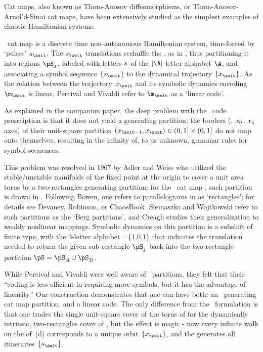 Cat maps, also known as Thom-Anosov diffeomorphisms, or
Thom-Anosov-Arnol'd-Sinai {cat maps}, have
been extensively studied as the simplest examples of chaotic Hamiltonian
systems.

\PV\ cat map  is a discrete time non-autonomous
Hamiltonian system, time-forced by `pulses' $\Ssym{\zeit}$.
The $\Ssym{\zeit}$ translations reshuffle the \statesp, as in
, thus partitioning it into regions
$\pS_\Ssym{}$, labeled with letters ${s_{}}$ of the $|\A|$-letter
alphabet $\A$, and associating a symbol sequence $\{\Ssym{\zeit}\}$ to
the dynamical trajectory $\{\ssp_{\zeit}\}$. As the relation
 between the trajectory \(\ssp_{\zeit}\) and its
symbolic dynamics encoding \(\m_{\zeit}\) is linear, Percival and Vivaldi
refer to \(\m_{\zeit}\) as a `linear code'.

As explained in the companion paper,
the deep problem with the \PV\ code prescription is that it does not
yield a generating partition; the borders (\ie, $x_0$, $x_1$ axes)
of their unit-square partition
$(\ssp_{\zeit-1},\ssp_{\zeit})\in(0,1]\times(0,1]$
do not map onto themselves, resulting in the infinity of, to us unknown,
grammar rules for {\inadmissible} symbol sequences.

This problem was resolved in 1967 by Adler and
Weiss who utilized the stable/\-unstable
manifolds of the fixed point at the origin to cover a unit area torus by
a two-rectangles generating partition; for the \PV\ cat map
, such partition is drawn in
. Following Bowen, one refers to
parallelograms in  as `rectangles'; for details
see Devaney, Robinson, or
ChaosBook. Siemaszko and Wojtkowski refer to
such partitions as the `Berg partitions', and Creagh studies
their generalization to weakly nonlinear mappings. Symbolic dynamics on
this partition is a subshift of finite type, with the 3-letter alphabet
\beq
\A=\{\underline{1},0,1\}
that indicates the translation needed to return the given sub-rectangle
$\pS_{{j}}$ back into the two-rectangle partition $\pS= \pS_{{A}}\cup
\pS_{{B}}$.

While Percival and Vivaldi were well aware of \AW\ partitions, they felt
that their ``coding is less efficient in requiring more symbols, but it
has the advantage of linearity.'' Our construction demonstrates that one
can have both:  an \AW\ generating cat map partition, and a linear code.
The only difference from the \PV\ formulation is that one
trades the single unit-square cover of the torus of
 for the dynamically intrinsic, two-rectangles
cover of , but the effect is magic - now every
infinite walk on the {\markGraph}  of \,(d)
corresponds to a unique {\admissible} orbit $\{\ssp_{\zeit}\}$, and the
{\markGraph} generates all {\admissible} itineraries $\{\Ssym{\zeit}\}$.

